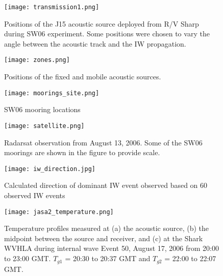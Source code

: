 



\clearpage

\begin{figure}[H]
\centering
  \texttt{[image: transmission1.png]}
  \caption{Positions of the J15 acoustic source deployed from R/V Sharp during SW06 experiment. Some positions were chosen to vary the angle between the acoustic track and the IW propagation.}
  \label{fig:transmission}
\end{figure}


\begin{figure}[H]
  \centering
  \texttt{[image: zones.png]}
  \caption{Positions of the fixed and mobile acoustic sources.}\label{fig:zones}
\end{figure}


\begin{figure}[H]
\centering
  \texttt{[image: moorings\_site.png]}\\
  \caption{SW06 mooring locations}
  \label{fig:moorings}
\end{figure}



\begin{figure}[H]
\centering
  \texttt{[image: satellite.png]}\\
  \caption{Radarsat observation from August 13, 2006. Some of the SW06
moorings are shown in the figure to provide scale.}
  \label{fig:satellite}
\end{figure}


\begin{figure}[H]
\centering
  \texttt{[image: iw\_direction.jpg]}\\
  \caption{Calculated direction of dominant IW event observed based on 60 observed IW events}
  \label{fig:IW_dir}
\end{figure}

\begin{figure}
  \centering
  \texttt{[image: jasa2\_temperature.png]}
  \caption{Temperature profiles measured at (a) the acoustic source, (b) the midpoint between the source and receiver, and (c) at the Shark WVHLA during internal wave Event 50, August 17, 2006 from 20:00 to 23:00 GMT. $T_{g1}$ = 20:30 to 20:37 GMT and $T_{g2}$ = 22:00 to 22:07 GMT.}\label{fig:temp}
\end{figure}
